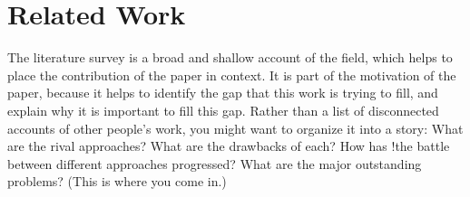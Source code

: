 \section{Related Work}\label{sec:relatedwork}
The literature survey is a broad and shallow account of the field, which helps
to place the contribution of the paper in context. It is part of the motivation
of the paper, because it helps to identify the gap that this work is trying to
fill, and explain why it is important to fill this gap. Rather than a list of
disconnected accounts of other people's work, you might want to organize it
into a story: What are the rival approaches? What are the drawbacks of each?
How has !the battle between different approaches progressed? What are the major
outstanding problems? (This is where you come in.)
